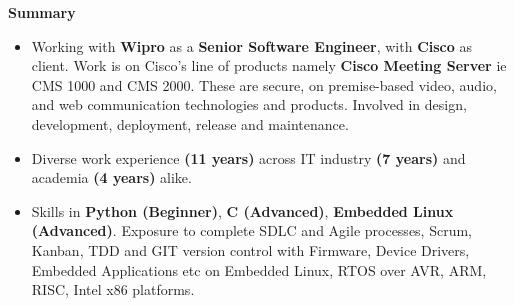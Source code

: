 \begin{center}
    \textbf{Summary}
\end{center}

\begin{itemize}
    \item {Working with \textbf{Wipro} as a \textbf{Senior Software Engineer}, with \textbf{Cisco} as client. Work is on Cisco's line of products namely \textbf{Cisco Meeting Server} ie CMS 1000 and CMS 2000. These are secure, on premise-based video, audio, and web communication technologies and products. Involved in design, development, deployment, release and maintenance.}\\
           
            
            \item {Diverse work experience \textbf{(11 years)} across IT industry \textbf{(7 years)} and academia \textbf{(4 years)} alike.}\\
            
            
            \item {Skills in  \textbf{Python (Beginner)}, \textbf{C (Advanced)}, \textbf{Embedded Linux (Advanced)}. Exposure to complete SDLC and Agile processes, Scrum, Kanban, TDD and GIT version control with Firmware, Device Drivers, Embedded Applications etc on Embedded Linux, RTOS over AVR, ARM, RISC, Intel x86 platforms.}\\
            
            

\end{itemize}
